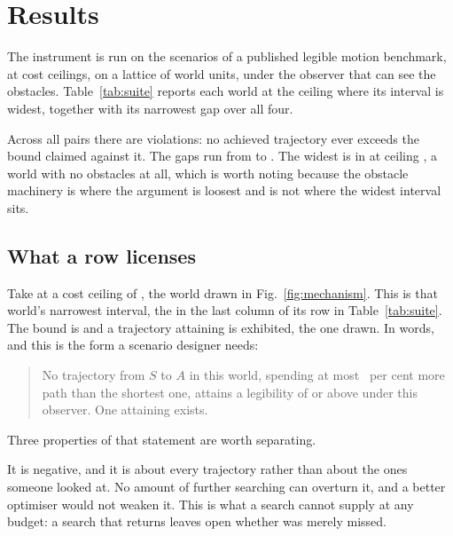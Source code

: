 \documentclass[journal]{IEEEtran}
\begin{document}
\section{Results}
\label{sec:results}

The instrument is run on the \suiteWorlds{} scenarios of a published legible
motion benchmark, at \suiteCeilings{} cost ceilings, on a lattice of
\suiteLattice{} world units, under the observer that can see the obstacles.
Table~\ref{tab:suite} reports each world at the ceiling where its interval is
widest, together with its narrowest gap over all four.

Across all \suitePairs{} pairs there are \suiteViolations{} violations: no
achieved trajectory ever exceeds the bound claimed against it. The gaps run
from \suiteBestGap{} to \suiteWorstGap{}. The widest is in
\suiteWorstGapWorld{} at ceiling \suiteWorstGapCeiling{}, a world with no
obstacles at all, which is worth noting because the obstacle machinery is
where the argument is loosest and is not where the widest interval sits.



\subsection{What a row licenses}
\label{sec:licenses}

Take \exampleWorld{} at a cost ceiling of \exampleCeiling{}, the world drawn in
Fig.~\ref{fig:mechanism}. This is that world's narrowest interval, the
\exampleGap{} in the last column of its row in Table~\ref{tab:suite}. The bound
is \exampleBound{} and a trajectory attaining \exampleAchieved{} is exhibited,
the one drawn. In words, and this is the form a scenario designer needs:

\begin{quote}
No trajectory from $S$ to $A$ in this world, spending at most
\examplePercent{}~per cent more path than the shortest one, attains a
legibility of \exampleThreshold{} or above under this observer. One attaining
\exampleAchieved{} exists.
\end{quote}

\noindent Three properties of that statement are worth separating.

It is negative, and it is about every trajectory rather than about the ones
someone looked at. No amount of further searching can overturn it, and a
better optimiser would not weaken it. This is what a search cannot supply at
any budget: a search that returns \exampleAchieved{} leaves open whether
\exampleThreshold{} was merely missed.
\end{document}
